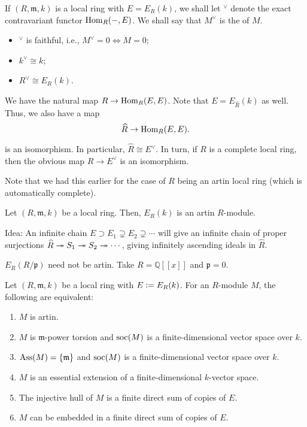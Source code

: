 \documentclass[12pt]{article}
\begin{document}
If $(R, \mathfrak{m}, k)$ is a local ring with $E = E_{R}(k)$, we shall let $^{\vee}$ denote the exact contravariant functor $\operatorname{Hom}_{R}(-, E)$. We shall say that $M^{\vee}$ is the  of $M$.
\begin{itemize}
	\item $^{\vee}$ is faithful, i.e., $M^{\vee} = 0 \Leftrightarrow M = 0$;
	\item $k^{\vee} \cong k$;
	\item $R^{\vee} \cong E_{R}(k)$.
\end{itemize}
We have the natural map $R \to \operatorname{Hom}_{R}(E, E)$. Note that $E = E_{\widehat{R}}(k)$ as well. Thus, we also have a map
\begin{equation} \label{eq:001}
	\widehat{R} \to \operatorname{Hom}_{R}(E, E).
\end{equation}

\begin{thm}
	 is an isomorphism. In particular, $\widehat{R} \cong E^{\vee}$. In turn, if $R$ is a complete local ring, then the obvious map $R \to E^{\vee}$ is an isomorphism.
\end{thm}
Note that we had this earlier for the case of $R$ being an artin local ring (which is automatically complete).

\begin{cor}
	Let $(R, \mathfrak{m}, k)$ be a local ring. Then, $E_{R}(k)$ is an artin $R$-module.
\end{cor}
Idea: An infinite chain $E \supset E_{1} \supsetneq E_{2} \supsetneq \cdots$ will give an infinite chain of proper surjections $\widehat{R} \twoheadrightarrow S_{1} \twoheadrightarrow S_{2} \twoheadrightarrow \cdots$, giving infinitely ascending ideals in $\widehat{R}$.

\begin{ex}
	$E_{R}(R/\mathfrak{p})$ need not be artin. Take $R = \mathbb{Q}[\![x]\!]$ and $\mathfrak{p} = 0$.
\end{ex}

\begin{thm}
	Let $(R, \mathfrak{m}, k)$ be a local ring with $E \vcentcolon= E_{R}(k)$. For an $R$-module $M$, the following are equivalent:
	\begin{enumerate}[label=(\alph*)]
		\item $M$ is artin.
		\item $M$ is $\mathfrak{m}$-power torsion and $\operatorname{soc}(M)$ is a finite-dimensional vector space over $k$.
		\item $\operatorname{Ass}(M) = \{\mathfrak{m}\}$ and $\operatorname{soc}(M)$ is a finite-dimensional vector space over $k$.
		\item $M$ is an essential extension of a finite-dimensional $k$-vector space.
		\item The injective hull of $M$ is a finite direct sum of copies of $E$.
		\item $M$ can be embedded in a finite direct sum of copies of $E$.
	\end{enumerate}
\end{thm}
\end{document}
